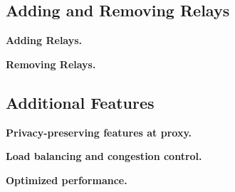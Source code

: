 
\subsection{Adding and Removing Relays}

{\bf Adding Relays.}

{\bf Removing Relays.}

\subsection{Additional Features}

{\bf Privacy-preserving features at proxy.}

{\bf Load balancing and congestion control.}

{\bf Optimized performance.}
